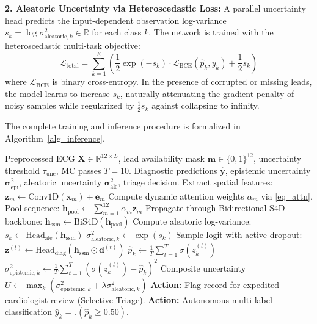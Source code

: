 \documentclass[journal,11pt,draftclsnofoot,onecolumn]{IEEEtran}
\begin{document}
\textbf{2. Aleatoric Uncertainty via Heteroscedastic Loss:}
A parallel uncertainty head predicts the input-dependent observation log-variance $s_k = \log \sigma_{\text{aleatoric}, k}^2 \in \mathbb{R}$ for each class $k$. The network is trained with the heteroscedastic multi-task objective:
\begin{equation}
    \mathcal{L}_{\text{total}} = \sum_{k=1}^K \left( \frac{1}{2}\exp(-s_k) \cdot \mathcal{L}_{\text{BCE}}(\hat{p}_k, y_k) + \frac{1}{2} s_k \right)
\end{equation}
where $\mathcal{L}_{\text{BCE}}$ is binary cross-entropy. In the presence of corrupted or missing leads, the model learns to increase $s_k$, naturally attenuating the gradient penalty of noisy samples while regularized by $\frac{1}{2} s_k$ against collapsing to infinity.

The complete training and inference procedure is formalized in Algorithm~\ref{alg_inference}.

\begin{algorithm}[!t]
\caption{CardioLAC-SSM Dynamic Inference and Safe Selective Triage}
\label{alg_inference}
\begin{algorithmic}[1]
\REQUIRE Preprocessed ECG $\mathbf{X} \in \mathbb{R}^{12 \times L}$, lead availability mask $\mathbf{m} \in \{0, 1\}^{12}$, uncertainty threshold $\tau_{\text{unc}}$, MC passes $T=10$.
\ENSURE Diagnostic predictions $\hat{\mathbf{y}}$, epistemic uncertainty $\boldsymbol{\sigma}_{\text{epi}}^2$, aleatoric uncertainty $\boldsymbol{\sigma}_{\text{ale}}^2$, triage decision.
    \STATE Extract spatial features: $\mathbf{z}_m \leftarrow \text{Conv1D}(\mathbf{x}_m) + \mathbf{e}_m$
\ENDFOR
\STATE Compute dynamic attention weights $\alpha_m$ via \eqref{eq_attn}.
\STATE Pool sequence: $\mathbf{h}_{\text{pool}} \leftarrow \sum_{m=1}^{12} \alpha_m \mathbf{z}_m$
\STATE Propagate through Bidirectional S4D backbone: $\mathbf{h}_{\text{ssm}} \leftarrow \text{BiS4D}(\mathbf{h}_{\text{pool}})$
\STATE Compute aleatoric log-variance: $s_k \leftarrow \text{Head}_{\text{ale}}(\mathbf{h}_{\text{ssm}})$
\STATE $\sigma_{\text{aleatoric}, k}^2 \leftarrow \exp(s_k)$
    \STATE Sample logit with active dropout: $\mathbf{z}^{(t)} \leftarrow \text{Head}_{\text{diag}}(\mathbf{h}_{\text{ssm}} \odot \mathbf{d}^{(t)})$
\ENDFOR
\STATE $\hat{p}_k \leftarrow \frac{1}{T}\sum_{t=1}^T \sigma(z_k^{(t)})$
\STATE $\sigma_{\text{epistemic}, k}^2 \leftarrow \frac{1}{T}\sum_{t=1}^T (\sigma(z_k^{(t)}) - \hat{p}_k)^2$
\STATE Composite uncertainty $U \leftarrow \max_k (\sigma_{\text{epistemic}, k}^2 + \lambda \sigma_{\text{aleatoric}, k}^2)$
    \STATE \textbf{Action:} Flag record for expedited cardiologist review (Selective Triage).
\ELSE
    \STATE \textbf{Action:} Autonomous multi-label classification $\hat{y}_k = \mathbb{I}(\hat{p}_k \ge 0.50)$.
\ENDIF
\end{algorithmic}
\end{algorithm}
\end{document}
